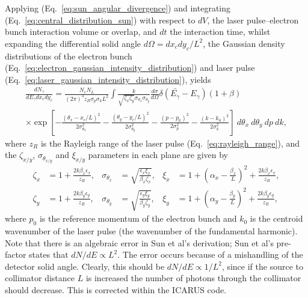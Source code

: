 \documentclass[../main.tex]{subfiles}
\begin{document}
Applying (Eq.~\ref{eq:sun_angular_divergence}) and integrating (Eq.~\ref{eq:central_distribution_sun}) with respect to $dV$, the laser pulse--electron bunch interaction volume or overlap, and $dt$ the interaction time, whilst expanding the differential solid angle $d\Omega = dx_{c}dy_{c}/L^{2}$, the Gaussian density distributions of the electron bunch (Eq.~\ref{eq:electron_gaussian_intensity_distribution}) and laser pulse (Eq.~\ref{eq:laser_gaussian_intensity_distribution}), yields
\begin{multline}
\frac{dN_{\gamma}}{dE_{\gamma}dx_{c}dy_{c}} = \frac{N_{e}N_{L}}{\left(2\pi\right)^{3}z_{R}\sigma_{p}\sigma_{k}L^{2}}\int \frac{k}{\sqrt{\zeta_{x}\zeta_{y}}\sigma_{\theta_{x}}\sigma_{\theta_{y}}}\frac{d\sigma}{d\Omega}\delta\left(\bar{E_{\gamma}}-E_{\gamma}\right)\left(1+\beta\right) \\\times\exp\left[-\frac{\left(\theta_{x}-x_{c}/L\right)^{2}}{2\sigma_{\theta_{x}}^{2}}-\frac{\left(\theta_{y}-y_{c}/L\right)^{2}}{2\sigma_{\theta_{y}}^{2}}-\frac{\left(p-p_{0}\right)^{2}}{2\sigma_{p}^{2}}-\frac{\left(k-k_{0}\right)^{2}}{2\sigma_{k}^{2}}\right]~d\theta_{x}~d\theta_{y}~dp~dk,
\label{eq:sun_volume_time_integral}    
\end{multline}
where $z_{R}$ is the Rayleigh range of the laser pulse (Eq.~\ref{eq:rayleigh_range}), and the $\zeta_{x/y}$, $\sigma_{\theta_{x/y}}$ and $\xi_{x/y}$ parameters in each plane are given by
\begin{align}
\zeta_{x} &= 1+\frac{2k\beta_{x}\epsilon_{x}}{z_{R}}, & \sigma_{\theta_{x}} &= \sqrt{\frac{\epsilon_{x}\xi_{x}}{\beta_{x}\zeta_{x}}}, & \xi_{x} &= 1+\left(\alpha_{x}-\frac{\beta_{x}}{L}\right)^{2}+\frac{2k\beta_{x}\epsilon_{x}}{z_{R}}, \nonumber\\
\zeta_{y} &= 1+\frac{2k\beta_{y}\epsilon_{y}}{z_{R}}, & \sigma_{\theta_{y}} &= \sqrt{\frac{\epsilon_{y}\xi_{y}}{\beta_{y}\zeta_{y}}}, & \xi_{y} &= 1+\left(\alpha_{y}-\frac{\beta_{y}}{L}\right)^{2}+\frac{2k\beta_{y}\epsilon_{y}}{z_{R}}, 
\label{eq:zeta_sigmatheta_xi_parameters_sun}
\end{align}
where $p_{0}$ is the reference momentum of the electron bunch and $k_{0}$ is the centroid wavenumber of the laser pulse (the wavenumber of the fundamental harmonic). Note that there is an algebraic error in Sun et al's \cite{sun2009characterizations,sun2011theoretical} derivation; Sun et al's pre-factor states that $dN/dE\propto L^{2}$. The error occurs because of a mishandling of the detector solid angle. Clearly, this should be $dN/dE\propto 1/L^{2}$, since if the source to collimator distance $L$ is increased the number of photons through the collimator should decrease. This is corrected within the \textsc{ICARUS} code. 
\end{document}
